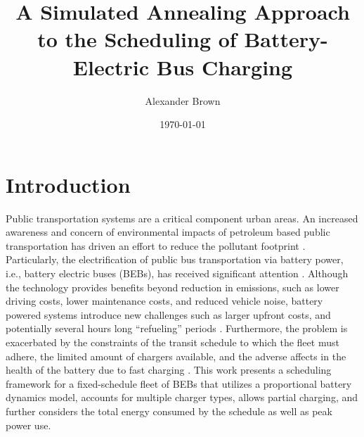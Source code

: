 \documentclass[energies,article,submit,moreauthors]{Definitions/mdpi}
\author{Alexander Brown}
\date{\today}
\title{A Simulated Annealing Approach to the Scheduling of Battery-Electric Bus Charging}
\begin{document}
\maketitle
\tableofcontents

\parskip 3mm                                %
\let\ref\autoref                            %

\section{Introduction}
\label{sec:introduction}
Public transportation systems are a critical component urban areas. An increased awareness and concern of environmental
impacts of petroleum based public transportation has driven an effort to reduce the pollutant footprint
\cite{de-2014-simul-elect,xylia-2018-role-charg,guida-2017-zeeus-repor-europ,li-2016-batter-elect}. Particularly,
the electrification of public bus transportation via battery power, i.e., battery electric buses (BEBs), has received
significant attention \cite{li-2016-batter-elect}. Although the technology provides benefits beyond reduction in
emissions, such as lower driving costs, lower maintenance costs, and reduced vehicle noise, battery powered systems
introduce new challenges such as larger upfront costs, and potentially several hours long ``refueling'' periods
\cite{xylia-2018-role-charg,li-2016-batter-elect}. Furthermore, the problem is exacerbated by the constraints of the
transit schedule to which the fleet must adhere, the limited amount of chargers available, and the adverse affects in
the health of the battery due to fast charging \cite{lutsey-2019-updat-elect}. This work presents a scheduling
framework for a fixed-schedule fleet of BEBs that utilizes a proportional battery dynamics model, accounts for multiple
charger types, allows partial charging, and further considers the total energy consumed by the schedule as well as peak
power use.
\end{document}

